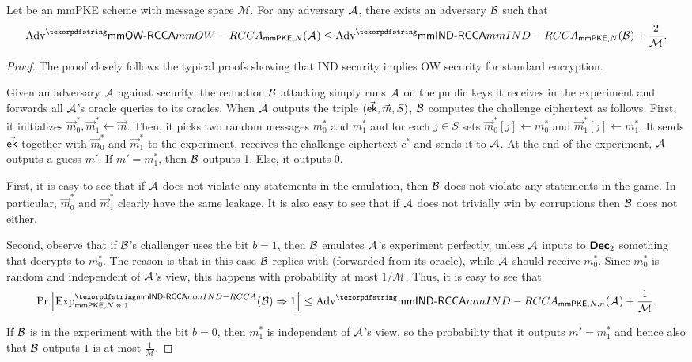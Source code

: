 \begin{theorem}
Let \mmPKE be an mmPKE scheme with message space $\mathcal M$. For any adversary $\mathcal{A}_{\relax}$, there exists an adversary $\mathcal{B}_{\relax}$ such that
\begin{equation*}
  \textnormal{Adv}^\mmowrcca_{\mmPKE,N}(\Adv) \leq \textnormal{Adv}^\mmindrcca_{\mmPKE,N}(\Bdv) + \frac{2}{\mathcal M}.
\end{equation*}
\end{theorem}
\begin{proof}
  The proof closely follows the typical proofs showing that IND security implies OW security for standard encryption.
  
  Given an adversary $\mathcal{A}_{\relax}$ against \mmowrcca security, the reduction $\mathcal{B}_{\relax}$ attacking \mmindrcca simply runs $\mathcal{A}_{\relax}$ on the public keys it receives in the \mmindrcca experiment and forwards all $\mathcal{A}_{\relax}$'s oracle queries to its \mmindrcca oracles.
  When $\mathcal{A}_{\relax}$ outputs the triple $(\vec{{\mathsf{ek}}}, \vec m, S)$, $\mathcal{B}_{\relax}$ computes the challenge ciphertext as follows.
  First, it initializes $\vec m_0^*, \vec m_1^* \gets \vec m$. Then, it picks two random messages $m_0^*$ and $m_1^*$ and for each $j\in S$ sets $\vec m_0^*[j] \gets m_0^*$ and $\vec m_1^*[j] \gets m_1^*$. It sends $\vec{{\mathsf{ek}}}$ together with $\vec m_0^*$ and $\vec m_1^*$ to the \mmindrcca experiment, receives the challenge ciphertext $c^*$ and sends it to $\mathcal{A}_{\relax}$.
  At the end of the experiment, $\mathcal{A}_{\relax}$ outputs a guess $m'$. If $m'=m_1^*$, then $\mathcal{B}_{\relax}$ outputs 1. Else, it outputs 0.

  First, it is easy to see that if $\mathcal{A}_{\relax}$ does not violate any \KwReq{} statements in the emulation, then $\mathcal{B}_{\relax}$ does not violate any \KwReq{} statements in the \mmindrcca game. In particular, $\vec m_0^*$ and $\vec m_1^*$ clearly have the same leakage.
  It is also easy to see that if $\mathcal{A}_{\relax}$ does not trivially win by corruptions then $\mathcal{B}_{\relax}$ does not either.

  Second, observe that if $\mathcal{B}_{\relax}$'s challenger uses the bit $b=1$, then $\mathcal{B}_{\relax}$ emulates $\mathcal{A}_{\relax}$'s experiment perfectly, unless $\mathcal{A}_{\relax}$ inputs to $\textnormal{\textsf{\bfseries Dec}}_2$ something that decrypts to $m_0^*$. The reason is that in this case $\mathcal{B}_{\relax}$ replies with  (forwarded from its oracle), while $\mathcal{A}_{\relax}$ should receive $m_0^*$. Since $m_0^*$ is random and independent of $\mathcal{A}_{\relax}$'s view, this happens with probability at most $1/\mathcal M$. Thus, it is easy to see that
  \[\Pr\left[\experiment{\mmindrcca}{\mmPKE,N,n,1}(\Bdv)\Rightarrow 1\right] \leq \textnormal{Adv}^\mmindrcca_{\mmPKE,N,n}(\Adv) + \frac{1}{\mathcal M}.\]

  If $\mathcal{B}_{\relax}$ is in the experiment with the bit $b=0$, then $m_1^*$ is independent of $\mathcal{A}_{\relax}$'s view, so the probability that it outputs $m'=m_1^*$ and hence also that $\mathcal{B}_{\relax}$ outputs $1$ is at most $\frac{1}{\mathcal M}$.
\end{proof}

